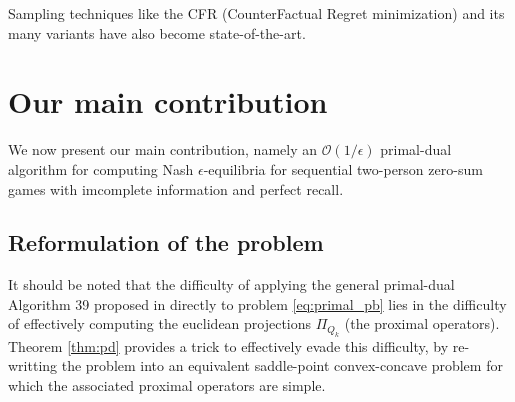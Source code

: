\documentclass[12pt]{article}
\begin{document}
Sampling techniques like the CFR (CounterFactual Regret minimization) and its many variants \cite{MartinZinkevichNIPS2007, lanctot2009monte, Bowling09012015} have also become state-of-the-art.

\section{Our main contribution}
\label{sec:algo}
We now present our main contribution, namely an $\mathcal{O}(1/\epsilon)$ primal-dual algorithm for computing Nash $\epsilon$-equilibria for sequential two-person zero-sum games with imcomplete information and perfect recall.

\subsection{Reformulation of the problem}
It should be noted that the difficulty of applying the general primal-dual Algorithm 39 proposed in \cite{chambolle2010} directly to problem \eqref{eq:primal_pb} lies in the difficulty of effectively computing the euclidean projections $\Pi_{Q_k}$ (the proximal operators). Theorem \ref{thm:pd} provides a trick to effectively evade this difficulty, by re-writting the problem into an equivalent saddle-point convex-concave problem for which the associated proximal operators are simple.
\end{document}
